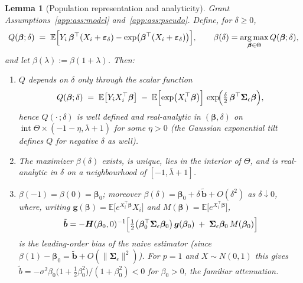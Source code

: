 \documentclass[11pt]{article}
\theoremstyle{plain}
\newtheorem{lemma}{Lemma}
\theoremstyle{definition}
\newcommand{\E}{\mathbb{E}}
\newcommand{\bet}{\bm{\beta}}
\newcommand{\beps}{\bm{\varepsilon}}
\newcommand{\bSig}{\bm{\Sigma}}
\DeclareMathOperator*{\argmax}{arg\,max}
\begin{document}
\begin{lemma}[Population representation and analyticity]\label{app:lem:curve}
Grant Assumptions~\ref{app:ass:model} and~\ref{app:ass:pseudo}. Define, for
$\delta\ge 0$,
\begin{equation}\label{app:eq:popobj}
  Q(\bet;\delta)
  \;=\; \E\Bigl[Y_i\,\bet^\top(X_i+\beps_\delta)
      -\exp\bigl(\bet^\top(X_i+\beps_\delta)\bigr)\Bigr],
  \qquad
  \beta(\delta)=\argmax_{\bet\in\Theta}Q(\bet;\delta),
\end{equation}
and let $\beta(\lambda):=\beta(1+\lambda)$. Then:
\begin{enumerate}\itemsep2pt
\item[(i)] $Q$ depends on $\delta$ only through the scalar function
      \[
        Q(\bet;\delta)\;=\;\E\bigl[Y_iX_i^\top\bet\bigr]
        \;-\;\E\Bigl[\exp\bigl(X_i^\top\bet\bigr)\Bigr]\,
        \exp\!\Bigl(\tfrac{\delta}{2}\,\bet^\top\bSig_\epsilon\bet\Bigr),
      \]
      hence $Q(\cdot\,;\delta)$ is well defined and real-analytic in
      $(\bet,\delta)$ on $\operatorname{int}\Theta\times(-1-\eta,\bar\lambda+1)$
      for some $\eta>0$ (the Gaussian exponential tilt defines $Q$ for
      negative $\delta$ as well).
\item[(ii)] The maximizer $\beta(\delta)$ exists, is unique, lies in the
      interior of $\Theta$, and is real-analytic in $\delta$ on a
      neighbourhood of $[-1,\bar\lambda+1]$.
\item[(iii)] $\beta(-1)=\beta(0)=\bet_0$; moreover
      $\beta(\delta)=\bet_0+\delta\,\tilde{\bm b}+O(\delta^2)$ as
      $\delta\downarrow 0$, where, writing
      $\bm g(\bet)=\E\bigl[e^{X_i^\top\bet}X_i\bigr]$ and
      $M(\bet)=\E\bigl[e^{X_i^\top\bet}\bigr]$,
      \begin{equation}\label{app:eq:bias1}
        \tilde{\bm b}
        =-\bm H(\bet_0,0)^{-1}\Bigl[
          \tfrac12\bigl(\bet_0^\top\bSig_\epsilon\bet_0\bigr)\,
          \bm g(\bet_0)\;+\;\bSig_\epsilon\bet_0\,M(\bet_0)
        \Bigr]
      \end{equation}
      is the leading-order bias of the naive estimator (since
      $\beta(1)-\bet_0=\tilde{\bm b}+O(\|\bSig_\epsilon\|^2)$). For
      $p=1$ and $X\sim N(0,1)$ this gives
      $\tilde b=-\sigma^2\beta_0\bigl(1+\tfrac12\beta_0^2\bigr)
      /(1+\beta_0^2)<0$ for $\beta_0>0$, the familiar attenuation.
\end{enumerate}
\end{lemma}
\end{document}
